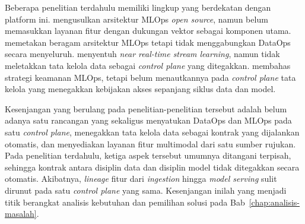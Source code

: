 Beberapa penelitian terdahulu memiliki lingkup yang berdekatan dengan platform ini. \textcite{burgueno2025toward} mengusulkan arsitektur MLOps \textit{open source}, namun belum memasukkan layanan fitur dengan dukungan vektor sebagai komponen utama. \textcite{najafabadi2024analysis} memetakan beragam arsitektur MLOps tetapi tidak menggabungkan DataOps secara menyeluruh. \textcite{rodrigues2025architecture} menyentuh \textit{near real-time stream learning}, namun tidak meletakkan tata kelola data sebagai \textit{control plane} yang ditegakkan. \textcite{ahmad2024mlops} membahas strategi keamanan MLOps, tetapi belum menautkannya pada \textit{control plane} tata kelola yang menegakkan kebijakan akses sepanjang siklus data dan model.

Kesenjangan yang berulang pada penelitian-penelitian tersebut adalah belum adanya satu rancangan yang sekaligus menyatukan DataOps dan MLOps pada satu \textit{control plane}, menegakkan tata kelola data sebagai kontrak yang dijalankan otomatis, dan menyediakan layanan fitur multimodal dari satu sumber rujukan. Pada penelitian terdahulu, ketiga aspek tersebut umumnya ditangani terpisah, sehingga kontrak antara disiplin data dan disiplin model tidak ditegakkan secara otomatis. Akibatnya, \textit{lineage} fitur dari \textit{ingestion} hingga \textit{model serving} sulit dirunut pada satu \textit{control plane} yang sama. Kesenjangan inilah yang menjadi titik berangkat analisis kebutuhan dan pemilihan solusi pada Bab~\ref{chap:analisis-masalah}.
